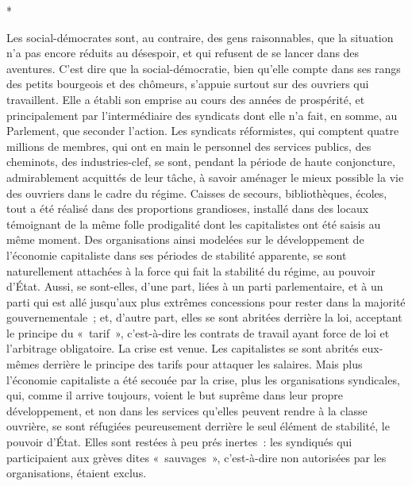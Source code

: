 \documentclass[french,twoside]{book} %
\begin{document}
\begin{center}
*\end{center}
\noindent Les social-démocrates sont, au contraire, des gens raisonnables, que la situation n'a pas encore réduits au désespoir, et qui refusent de se lancer dans des aventures. C'est dire que la social-démocratie, bien qu'elle compte dans ses rangs des petits bourgeois et des chômeurs, s'appuie surtout sur des ouvriers qui travaillent. Elle a établi son emprise au cours des années de prospérité, et principalement par l'intermédiaire des syndicats dont elle n'a fait, en somme, au Parlement, que seconder l'action. Les syndicats réformistes, qui comptent quatre millions de membres, qui ont en main le personnel des services publics, des cheminots, des industries-clef, se sont, pendant la période de haute conjoncture, admirablement acquittés de leur tâche, à savoir aména­ger le mieux possible la vie des ouvriers dans le cadre du régime. Caisses de secours, bibliothèques, écoles, tout a été réalisé dans des proportions gran­dioses, installé dans des locaux témoignant de la même folle prodigalité dont les capitalistes ont été saisis au même moment. Des organisations ainsi modelées sur le développement de l'économie capitaliste dans ses périodes de stabilité apparente, se sont naturellement attachées à la force qui fait la stabi­lité du régime, au pouvoir d'État. Aussi, se sont-elles, d'une part, liées à un parti parlementaire, et à un parti qui est allé jusqu'aux plus extrêmes conces­sions pour rester dans la majorité gouvernementale ; et, d'autre part, elles se sont abritées derrière la loi, acceptant le principe du « tarif », c'est-à-dire les contrats de travail ayant force de loi et l'arbitrage obligatoire. La crise est venue. Les capitalistes se sont abrités eux-mêmes derrière le principe des tarifs pour attaquer les salaires. Mais plus l'économie capitaliste a été secouée par la crise, plus les organisations syndicales, qui, comme il arrive toujours, voient le but suprême dans leur propre développement, et non dans les servi­ces qu'elles peuvent rendre à la classe ouvrière, se sont réfugiées peureuse­ment derrière le seul élément de stabilité, le pouvoir d'État. Elles sont restées à peu prés inertes : les syndiqués qui participaient aux grèves dites « sauvages », c'est-à-dire non autorisées par les organisations, étaient exclus.\par
\end{document}
